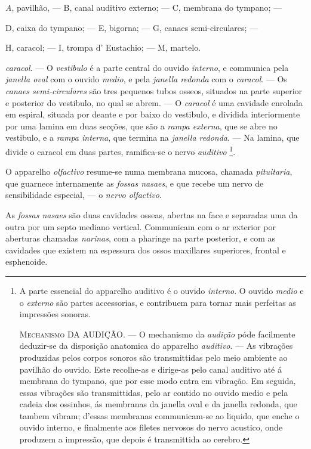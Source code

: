 \emph{A}, pavilhão, --- B, canal auditivo externo; --- C, membrana do tympano; ---

D, caixa do tympano; --- E, bigorna; --- G, canaes semi-circulares; ---

H, caracol; --- I, trompa d' Eustachio; --- M, martelo.

\emph{caracol}. --- O \emph{vestibulo} é a parte central do ouvido \emph{interno}, e communica pela \emph{janella oval} com o ouvido \emph{medio}, e pela \emph{janella redonda} com o \emph{caracol}. --- Os \emph{canaes semi-circulares} são tres pequenos tubos osseos, situados na parte superior e posterior do vestibulo, no qual se abrem. --- O \emph{caracol} é uma cavidade enrolada em espiral, situada por deante e por baixo do vestibulo, e dividida interiormente por uma lamina em   duas secções, que são a \emph{rampa externa}, que se abre no vestibulo, e a \emph{rampa interna}, que termina na \emph{janella redonda}. --- Na lamina, que divide o caracol em duas partes, ramifica-se o nervo \emph{auditivo} \footnote{A parte essencial do apparelho auditivo é o ouvido \emph{interno}. O ouvido \emph{medio} e o \emph{externo} são partes accessorias, e contribuem para tornar mais perfeitas as impressões sonoras.\par \textsc{Mechanismo} DA AUDIÇÃO. --- O mechanismo da \emph{audição} póde facilmente deduzir-se da disposição anatomica do apparelho \emph{auditivo}. --- As vibrações produzidas pelos corpos sonoros são transmittidas pelo meio ambiente ao pavilhão do ouvido. Este recolhe-as e dirige-as pelo canal auditivo até á membrana do tympano, que por esse modo entra em vibração. Em seguida, essas vibrações são transmittidas, pelo ar contido no ouvido medio e pela cadeia dos ossinhos, ás membranas da janella oval e da janella redonda, que tambem vibram; d'essas membranas communicam-se ao liquido, que enche o ouvido interno, e finalmente aos filetes nervosos do nervo acustico, onde produzem a impressão, que depois é transmittida ao cerebro.}.


 
O apparelho \emph{olfactivo} resume-se numa membrana mucosa, chamada \emph{pituitaria}, que guarnece internamente as \emph{fossas nasaes}, e que recebe um nervo de sensibilidade especial, --- o \emph{nervo olfactivo}.

As \emph{fossas nasaes} são duas cavidades osseas, abertas na face e separadas uma da outra por um septo mediano vertical. Communicam com o ar exterior por aberturas chamadas \emph{narinas}, com a pharinge na parte posterior, e com as cavidades que existem na espessura dos ossos maxillares superiores, frontal e esphenoide.

